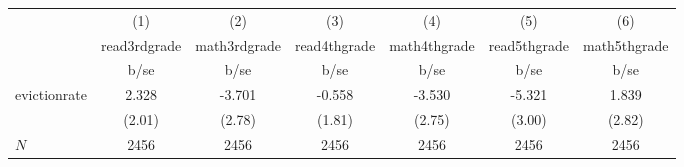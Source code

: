 {
\def\sym#1{\ifmmode^{#1}\else\(^{#1}\)\fi}
\begin{tabular}{l*{6}{c}}
\hline\hline
            &\multicolumn{1}{c}{(1)}           &\multicolumn{1}{c}{(2)}           &\multicolumn{1}{c}{(3)}           &\multicolumn{1}{c}{(4)}           &\multicolumn{1}{c}{(5)}           &\multicolumn{1}{c}{(6)}           \\
            &\multicolumn{1}{c}{read3rdgrade}  &\multicolumn{1}{c}{math3rdgrade}  &\multicolumn{1}{c}{read4thgrade}  &\multicolumn{1}{c}{math4thgrade}  &\multicolumn{1}{c}{read5thgrade}  &\multicolumn{1}{c}{math5thgrade}  \\
            &                     b/se         &                     b/se         &                     b/se         &                     b/se         &                     b/se         &                     b/se         \\
\hline
evictionrate&                    2.328         &                   -3.701         &                   -0.558         &                   -3.530         &                   -5.321         &                    1.839         \\
            &                   (2.01)         &                   (2.78)         &                   (1.81)         &                   (2.75)         &                   (3.00)         &                   (2.82)         \\
\hline
\(N\)       &                     2456         &                     2456         &                     2456         &                     2456         &                     2456         &                     2456         \\
\hline\hline
\end{tabular}
}
